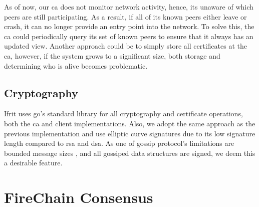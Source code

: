 \documentclass[USenglish]{uit-thesis}
\begin{document}


As of now, our \gls{ca} does not monitor network activity, hence, its unaware of which peers are still participating.
As a result, if all of its known peers either leave or crash, it can no longer provide an entry point into the network.
To solve this, the \gls{ca} could periodically query its set of known peers to ensure that it always has an updated view.
Another approach could be to simply store all certificates at the \gls{ca}, however, if the system grows to a significant size, both storage and determining who is alive becomes problematic.



\section{Cryptography}
Ifrit uses \gls{go}'s standard library for all cryptography and certificate operations, both the \gls{ca} and client implementations.
Also, we adopt the same approach as the previous implementation \cite{flies} and use elliptic curve signatures due to its low signature length compared to \gls{rsa} and \gls{dsa}.
As one of gossip protocol's limitations are bounded message sizes \cite{gossip_promise}, and all gossiped data structures are signed, we deem this a desirable feature. 








\chapter{FireChain Consensus}\label{chap:fireconsensus}
\end{document}
